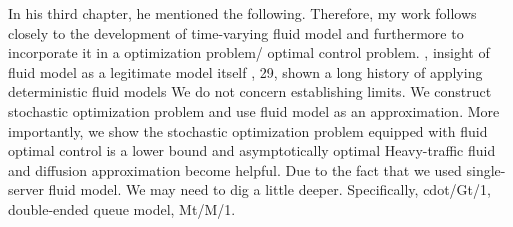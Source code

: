 {}\markdownRendererUlBeginTight
\markdownRendererUlItem In his third chapter, he mentioned the following.  Therefore, my work follows closely to the development of time-varying fluid model and furthermore to incorporate it in a optimization problem/ optimal control problem.\markdownRendererUlItemEnd 
\markdownRendererUlEndTight \markdownRendererInterblockSeparator
{}\markdownRendererInterblockSeparator
{}\markdownRendererUlBeginTight
{}, insight of fluid model as a legitimate model itself\markdownRendererUlItemEnd 
{}, 29, shown a long history of applying deterministic fluid models\markdownRendererUlItemEnd 
\markdownRendererUlItem \markdownRendererUnderscore{}\markdownRendererUlItemEnd 
\markdownRendererUlItem We do not concern establishing limits. We construct stochastic optimization problem and use fluid model as an approximation. More importantly, we show the stochastic optimization problem equipped with fluid optimal control is a lower bound and asymptotically optimal\markdownRendererUlItemEnd 
\markdownRendererUlEndTight \markdownRendererInterblockSeparator
{}\markdownRendererInterblockSeparator
{}\markdownRendererUlBeginTight
{} Heavy-traffic fluid and diffusion approximation become helpful. Due to the fact that we used single-server fluid model. We may need to dig a little deeper. Specifically, \markdownRendererDollarSign{}\markdownRendererBackslash{}cdot/Gt/1\markdownRendererDollarSign{}, double-ended queue model, \markdownRendererDollarSign{}M\markdownRendererUnderscore{}t/M/1\markdownRendererDollarSign{}.\markdownRendererUlItemEnd 
